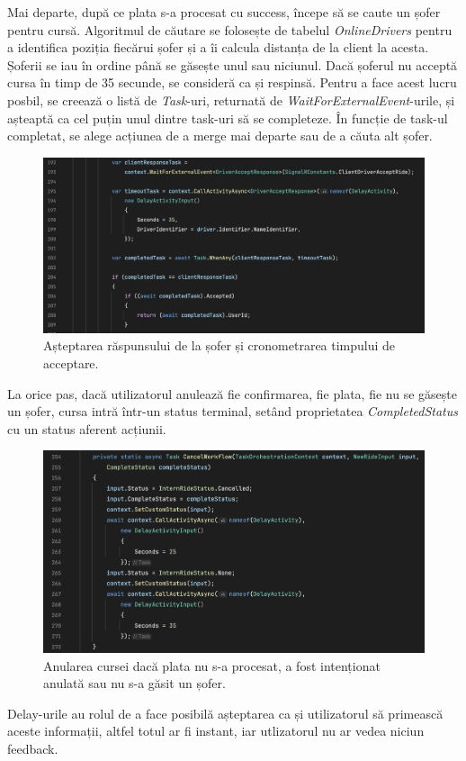 Mai departe, după ce plata s-a procesat cu success, începe să se caute un șofer pentru cursă.
Algoritmul de căutare se folosește de tabelul \textit{OnlineDrivers} pentru a identifica poziția
fiecărui șofer și a îi calcula distanța de la client la acesta. Șoferii se iau în ordine până se găsește 
unul sau niciunul. Dacă șoferul nu acceptă cursa în timp de 35 secunde, se consideră ca și respinsă.
Pentru a face acest lucru posbil, se creează o listă de \textit{Task}-uri, returnată de \textit{WaitForExternalEvent}-urile,
și așteaptă ca cel puțin unul dintre task-uri să se completeze. În funcție de task-ul completat, se alege
acțiunea de a merge mai departe sau de a căuta alt șofer.

\begin{figure}[H]
    \centering
    \includegraphics[width=16cm]{Assets/WaitForDriver.png}
    \caption{Așteptarea răspunsului de la șofer și cronometrarea timpului de acceptare.}
    \label{fig:WaitForDriver}
\end{figure}

La orice pas, dacă utilizatorul anulează fie confirmarea, fie plata, fie nu se găsește un șofer, cursa intră într-un status
terminal, setând proprietatea \textit{CompletedStatus} cu un status aferent acțiunii.
\begin{figure}[H]
    \centering
    \includegraphics[width=16cm]{Assets/cancelFlow.png}
    \caption{Anularea cursei dacă plata nu s-a procesat, a fost intenționat anulată sau nu s-a găsit un șofer.}
    \label{fig:cancelFlow}
\end{figure}
Delay-urile au rolul de a face posibilă așteptarea ca și utilizatorul să primească aceste informații, altfel totul ar fi instant,
iar utlizatorul nu ar vedea niciun feedback.

